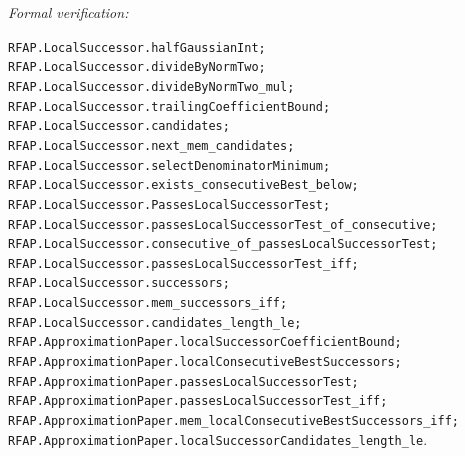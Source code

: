 \documentclass[11pt]{article}
\newcommand{\leanref}[1]{\par\smallskip\noindent
  \emph{Formal verification:}\par\nobreak
  {\raggedright\nolinkurl{#1}.\par}}
\begin{document}
\leanref{RFAP.LocalSuccessor.halfGaussianInt;
RFAP.LocalSuccessor.divideByNormTwo;
RFAP.LocalSuccessor.divideByNormTwo_mul;
RFAP.LocalSuccessor.trailingCoefficientBound;
RFAP.LocalSuccessor.candidates;
RFAP.LocalSuccessor.next_mem_candidates;
RFAP.LocalSuccessor.selectDenominatorMinimum;
RFAP.LocalSuccessor.exists_consecutiveBest_below;
RFAP.LocalSuccessor.PassesLocalSuccessorTest;
RFAP.LocalSuccessor.passesLocalSuccessorTest_of_consecutive;
RFAP.LocalSuccessor.consecutive_of_passesLocalSuccessorTest;
RFAP.LocalSuccessor.passesLocalSuccessorTest_iff;
RFAP.LocalSuccessor.successors;
RFAP.LocalSuccessor.mem_successors_iff;
RFAP.LocalSuccessor.candidates_length_le;
RFAP.ApproximationPaper.localSuccessorCoefficientBound;
RFAP.ApproximationPaper.localConsecutiveBestSuccessors;
RFAP.ApproximationPaper.passesLocalSuccessorTest;
RFAP.ApproximationPaper.passesLocalSuccessorTest_iff;
RFAP.ApproximationPaper.mem_localConsecutiveBestSuccessors_iff;
RFAP.ApproximationPaper.localSuccessorCandidates_length_le}
\end{document}
